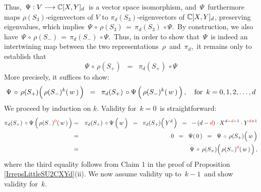 Thus, \,$\Psi : V \longrightarrow \mathbb{C}[X,Y]_{d}$\, is a vector space isomorphism, and
\,$\Psi$\, furthermore maps $\rho(S_{3})$-eigenvectors of $V$ to $\pi_{d}(S_{3})$-eigenvectors of $\mathbb{C}[X,Y]_{d}$,
preserving eigenvalues, which implies
\,$\Psi \,\circ\, \rho(S_{3}) \,=\, \pi_{d}(S_{3}) \,\circ \Psi$.\,
By construction, we also have
\,$\Psi \,\circ\, \rho(S_{-}) \,=\, \pi_{d}(S_{-}) \,\circ \Psi$.\,
Thus, in order to show that \,$\Psi$\, is indeed an intertwining map between the two representations
\,$\rho$\, and \,$\pi_{d}$,\,
it remains only to establish that
\begin{equation*}
\Psi \,\circ\, \rho(S_{+})
\;\; = \;\;
	\pi_{d}(S_{+}) \,\circ \Psi
\end{equation*}
More precisely, it suffices to show:
\begin{equation*}
\Psi \,\circ\, \rho(S_{+})\!\left(\,\rho(S_{-})^{k}(\,\overset{{\color{white}1}}{w}\,)\,\right)
\;\; = \;\;
	\pi_{d}(S_{+}) \,\circ \Psi \left(\,\rho(S_{-})^{k}(\,\overset{{\color{white}1}}{w}\,)\,\right),
\quad
\textnormal{for \,$k = 0, 1, 2, \ldots, d$}
\end{equation*}
We proceed by induction on $k$.
Validity for \,$k = 0$\, is straightforward:
\begin{eqnarray*}
\pi_{d}(S_{+}) \,\circ \Psi \left(\,\rho(S_{-})^{{\color{red}0}}(\,\overset{{\color{white}1}}{w}\,)\,\right)
& = &
	\pi_{d}(S_{+}) \,\circ \Psi \left(\,\overset{{\color{white}1}}{w}\,\right)
\;\; = \;\;
	\pi_{d}(S_{+})\!\left(\!\overset{{\color{white}.}}{{\color{white}i}}Y^{d}\,\right)
\;\; = \;\;
	-\,(d - {\color{red}d}) \cdot X^{d - {\color{red}d}-1} \cdot Y^{{\color{red}d}+1}
\\
& = &
	0
\;\; = \;\;
	\Psi(\,0\,)
\;\; = \;\;
	\Psi \,\circ\, \rho(S_{+})\!\left(\,\overset{{\color{white}1}}{w}\,\right)
\\
& = &
\Psi \,\circ\, \rho(S_{+})\!\left(\,\rho(S_{-})^{{\color{red}0}}(\,\overset{{\color{white}1}}{w}\,)\,\right),
\end{eqnarray*}
where the third equality follows from Claim 1 in the proof of Proposition \ref{IrrepsLittleSU2CXYd}(ii).
We now assume validity up to \,$k-1$\, and show validity for \,$k$.\,
